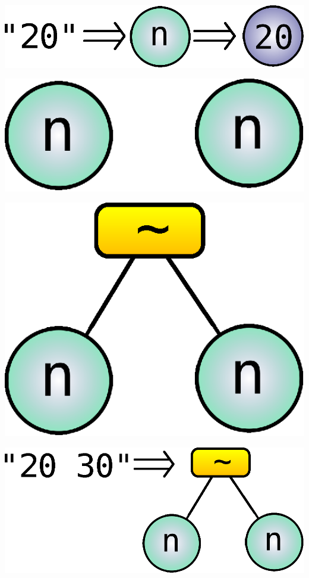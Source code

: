 \documentclass{beamer}
\begin{document}
\begin{frame}
  \includegraphics[scale=0.80]{images/single-parser-example.eps}
\end{frame}

\begin{frame}
  \includegraphics[scale=0.50]{images/combined-parsers-example-1.eps}
\end{frame}

\begin{frame}
  \includegraphics[scale=0.50]{images/combined-parsers-example-2.eps}
\end{frame}

\begin{frame}
  \includegraphics[scale=0.50]{images/combined-parsers-example-3.eps}
\end{frame}
\end{document}
